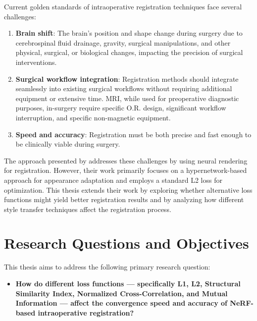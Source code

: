Current golden standards of intraoperative registration techniques face several challenges:

\begin{enumerate}
    \item \textbf{Brain shift}: The brain's position and shape change during surgery due to cerebrospinal fluid drainage, gravity, surgical manipulations, and other physical, surgical, or biological changes, impacting the precision of surgical interventions. \cite{Iversen2018Automatic}
    \item \textbf{Surgical workflow integration}: Registration methods should integrate seamlessly into existing surgical workflows without requiring additional equipment or extensive time. MRI, while used for preoperative diagnostic purposes, in-surgery require specific O.R. design, significant workflow interruption, and specific non-magnetic equipment. \cite{Gandhe2018Intraoperative}
    \item \textbf{Speed and accuracy}: Registration must be both precise and fast enough to be clinically viable during surgery. \cite{Riva2020Intraoperative}
\end{enumerate}

The approach presented by \textcite{fehrentz2024intraoperative} addresses these challenges by using neural rendering for registration. However, their work primarily focuses on a hypernetwork-based approach for appearance adaptation and employs a standard L2 loss for optimization. This thesis extends their work by exploring whether alternative loss functions might yield better registration results and by analyzing how different style transfer techniques affect the registration process.



\section{Research Questions and Objectives}\label{section:research-questions}

This thesis aims to address the following primary research question:

\begin{itemize}
    \item \textbf{How do different loss functions — specifically L1, L2, Structural Similarity Index, Normalized Cross-Correlation, and Mutual Information — affect the convergence speed and accuracy of NeRF-based intraoperative registration?}
\end{itemize}


